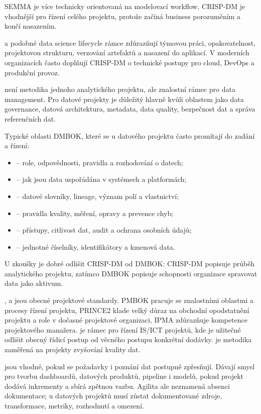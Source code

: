 SEMMA je více technicky orientovaná na modelovací workflow. CRISP-DM je vhodnější pro řízení celého projektu, protože začíná business porozuměním a končí nasazením.

 a podobné data science lifecycle rámce zdůrazňují týmovou práci, opakovatelnost, projektovou strukturu, verzování artefaktů a nasazení do aplikací. V moderních organizacích často doplňují CRISP-DM o technické postupy pro cloud, DevOps a produkční provoz.

 není metodika jednoho analytického projektu, ale znalostní rámec pro data management. Pro datové projekty je důležitý hlavně kvůli oblastem jako data governance, datová architektura, metadata, data quality, bezpečnost dat a správa referenčních dat.

Typické oblasti DMBOK, které se u datového projektu často promítají do zadání a řízení:
\begin{itemize}
  \item {} -- role, odpovědnosti, pravidla a rozhodování o datech;
  \item {} -- jak jsou data uspořádána v systémech a platformách;
  \item {} -- datové slovníky, lineage, význam polí a vlastnictví;
  \item {} -- pravidla kvality, měření, opravy a prevence chyb;
  \item {} -- přístupy, citlivost dat, audit a ochrana osobních údajů;
  \item {} -- jednotné číselníky, identifikátory a kmenová data.
\end{itemize}

U zkoušky je dobré odlišit CRISP-DM od DMBOK: CRISP-DM popisuje průběh analytického projektu, zatímco
DMBOK popisuje schopnosti organizace spravovat data jako aktivum.

,  a  jsou obecné projektové standardy. PMBOK pracuje se
znalostními oblastmi a procesy řízení projektu, PRINCE2 klade velký důraz na obchodní opodstatnění
projektu a role v dočasné projektové organizaci, IPMA zdůrazňuje kompetence projektového manažera.
 je rámec pro řízení IS/ICT projektů, kde je užitečné odlišit obecný řídicí postup od
věcného postupu konkrétní dodávky.  je metodika zaměřená na projekty zvyšování
kvality dat.

 jsou vhodné, pokud se požadavky i poznání dat postupně zpřesňují. Dávají smysl pro tvorbu dashboardů, datových produktů, pipeline i modelů, pokud projekt dodává inkrementy a sbírá zpětnou vazbu. Agilita ale neznamená absenci dokumentace; u datových projektů musí zůstat dokumentované zdroje, transformace, metriky, rozhodnutí a omezení.

